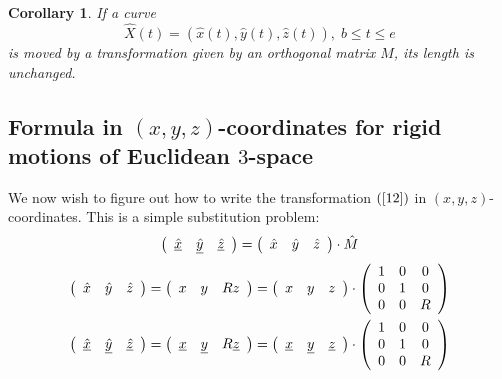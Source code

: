 \documentclass{article}%
\newtheorem{corollary}[theorem]{Corollary}
\begin{document}
\begin{corollary}
If a curve
\[
\hat{X}\left(  t\right)  =\left(  \hat{x}\left(  t\right)  ,\hat{y}\left(
t\right)  ,\hat{z}\left(  t\right)  \right)  ,\;b\leq t\leq e
\]
is moved by a transformation given by an orthogonal matrix $\hat{M}$, its
length is unchanged.\pagebreak
\end{corollary}

\subsection{Formula in $\left(  x,y,z\right)  $-coordinates for rigid motions
of Euclidean $3$-space}

We now wish to figure out how to write the transformation $\left(
\ref{12}\right)  $ in $\left(  x,y,z\right)  $-coordinates. This is a simple
substitution problem:%
\begin{equation}
\left(
\begin{array}
[c]{ccc}%
\underline{\hat{x}} & \underline{\hat{y}} & \underline{\hat{z}}%
\end{array}
\right)  =\left(
\begin{array}
[c]{ccc}%
\hat{x} & \hat{y} & \hat{z}%
\end{array}
\right)  \cdot\hat{M} \label{100}%
\end{equation}%
\begin{gather*}
\left(
\begin{array}
[c]{ccc}%
\hat{x} & \hat{y} & \hat{z}%
\end{array}
\right)  =\left(
\begin{array}
[c]{ccc}%
x & y & Rz
\end{array}
\right)  =\left(
\begin{array}
[c]{ccc}%
x & y & z
\end{array}
\right)  \cdot\left(
\begin{array}
[c]{ccc}%
1 & 0 & 0\\
0 & 1 & 0\\
0 & 0 & R
\end{array}
\right) \\
\left(
\begin{array}
[c]{ccc}%
\underline{\hat{x}} & \underline{\hat{y}} & \underline{\hat{z}}%
\end{array}
\right)  =\left(
\begin{array}
[c]{ccc}%
\underline{x} & \underline{y} & R\underline{z}%
\end{array}
\right)  =\left(
\begin{array}
[c]{ccc}%
\underline{x} & \underline{y} & \underline{z}%
\end{array}
\right)  \cdot\left(
\begin{array}
[c]{ccc}%
1 & 0 & 0\\
0 & 1 & 0\\
0 & 0 & R
\end{array}
\right)
\end{gather*}
\end{document}
